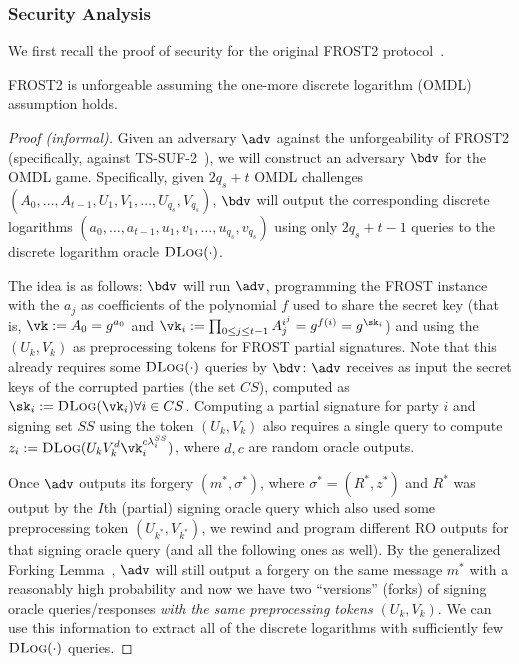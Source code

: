 \subsubsection{Security Analysis}

We first recall the proof of security for the original FROST2 protocol~\cite{C:BCKMTZ22}.

\begin{theorem}[informal]
    FROST2 is unforgeable assuming the one-more discrete logarithm (OMDL) assumption holds.
\end{theorem}

\begin{proof}[Proof (informal)]
Given an adversary $\adv$ against the unforgeability of FROST2 (specifically, against TS-SUF-2~\cite{C:BCKMTZ22}), we will construct an adversary $\bdv$ for the OMDL game. Specifically, given $2q_s + t$ OMDL challenges $(A_0, \dots, A_{t-1}, U_1, V_1, \dots, U_{q_s}, V_{q_s})$, $\bdv$ will output the corresponding discrete logarithms $(a_0, \dots, a_{t-1}, u_1, v_1,\allowbreak \dots, u_{q_s}, v_{q_s})$ using only $2q_s + t - 1$ queries to the discrete logarithm oracle $\textsc{DLog}(\cdot)$.

The idea is as follows: $\bdv$ will run $\adv$, programming the FROST instance with the $a_j$ as coefficients of the polynomial $f$ used to share the secret key (that is, $\vk := A_0 = g^{a_0}$ and $\vk_i := \prod_{0 \leq j \leq t-1} A_j^{i^j} = g^{f(i)} = g^{\sk_i}$) and using the $(U_k, V_k)$ as preprocessing tokens for FROST partial signatures. Note that this already requires some $\textsc{DLog}(\cdot)$ queries by $\bdv$: $\adv$ receives as input the secret keys of the corrupted parties (the set $CS$), computed as $\sk_i := \textsc{DLog}(\vk_i) \forall i \in CS$. Computing a partial signature for party $i$ and signing set $SS$ using the token $(U_k, V_k)$ also requires a single query to compute $z_i := \textsc{DLog}(U_k V_k^d \vk_i^{c \lambda_i^{SS}})$, where $d, c$ are random oracle outputs.

Once $\adv$ outputs its forgery $(m^*, \sigma^*)$, where $\sigma^* = (R^*, z^*)$ and $R^*$ was output by the $I$th (partial) signing oracle query which also used some preprocessing token $(U_{k^*}, V_{k^*})$, we rewind and program different RO outputs for that signing oracle query (and all the following ones as well). By the generalized Forking Lemma~\cite{CCS:BelNev06}, $\adv$ will still output a forgery on the same message $m^*$ with a reasonably high probability and now we have two ``versions'' (forks) of signing oracle queries/responses \emph{with the same preprocessing tokens $(U_k, V_k)$}. We can use this information to extract all of the discrete logarithms with sufficiently few ${\textsc{DLog}}(\cdot)$ queries.


\end{proof}
